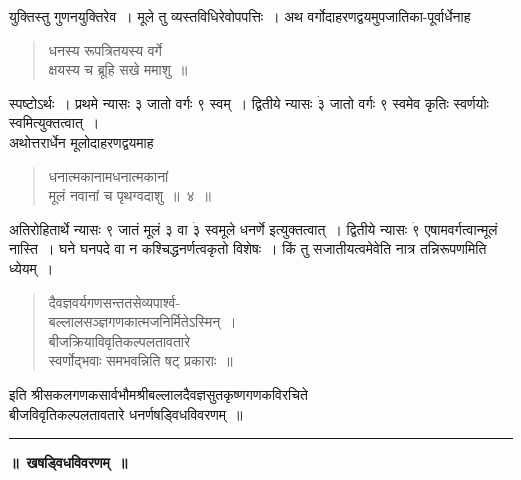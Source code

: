 \documentclass[11pt, openany]{book}
\begin{document}
\noindent युक्तिस्तु गुणनयुक्तिरेव~। मूले तु व्यस्तविधिरेवोपपत्तिः~। अथ
वर्गोदाहरणद्वयमुपजातिका-पूर्वार्धेनाह\textendash
\begin{quote}
    \ex
     धनस्य रूपत्रितयस्य वर्गे \\

\vspace{-7mm}
\hspace{0.7cm} क्षयस्य च ब्रूहि सखे ममाशु~॥
\end{quote}

 स्पष्टोऽर्थः~। प्रथमे न्यासः ३ जातो वर्गः ९ स्वम्~। द्वितीये न्यासः $\dot{\text{३}}$
जातो वर्गः ९ स्वमेव कृतिः स्वर्णयोः स्वमित्युक्तत्वात्~। \\

\vspace{-3mm}
 अथोत्तरार्धेन मूलोदाहरणद्वयमाह\textendash  
\begin{quote}
    \bs
    धनात्मकानामधनात्मकानां \\

\vspace{-7mm}
\hspace{0.7cm} मूलं नवानां च पृथग्वदाशु~॥~४~॥
\end{quote}
  
 अतिरोहितार्थे न्यासः ९ जातं मूलं ३ वा $\dot{\text{३}}$ स्वमूले धनर्णे इत्युक्तत्वात्~। द्वितीये न्यासः $\dot{\text{९}}$ एषामवर्गत्वान्मूलं नास्ति~। घने घनपदे वा न कश्चिद्धनर्णत्वकृतो विशेषः~। किं तु सजातीयत्वमेवेति नात्र तन्निरूपणमिति ध्येयम्~। 
\begin{quote}
    \qt
 दैवज्ञवर्यगणसन्ततसेव्यपार्श्व-\\
 बल्लालसञ्ज्ञगणकात्मजनिर्मितेऽस्मिन्~। \\
 बीजक्रियाविवृतिकल्पलतावतारे \\
 स्वर्णोद्भवाः समभवन्निति षट् प्रकाराः~॥
\end{quote}
\begin{center}
इति श्रीसकलगणकसार्वभौमश्रीबल्लालदैवज्ञसुतकृष्णगणकविरचिते \\
 बीजविवृतिकल्पलतावतारे धनर्णषड्विधविवरणम्~॥\\
 
     \rule{0.2\linewidth}{0.5pt}
\end{center}

\newpage%

 \label{kha}
\begin{center}
    \textbf{\LARGE ॥~खषड्विधविवरणम्~॥}
\end{center}
\end{document}
